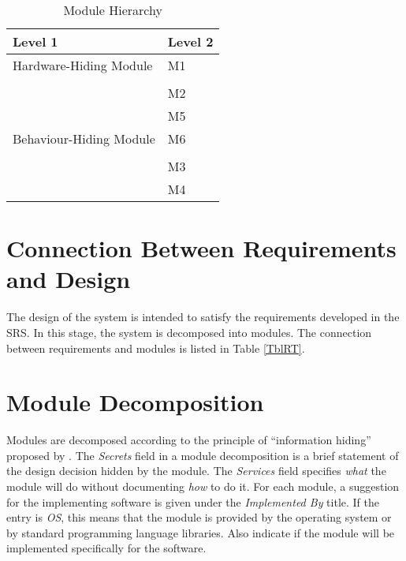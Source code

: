 \documentclass[12pt, titlepage]{article}
\begin{document}
\begin{table}[h!]
\centering
\begin{tabular}{p{} p{}}
\toprule
\textbf{Level 1} & \textbf{Level 2}\\
\midrule

{Hardware-Hiding Module} & M1 \\
\midrule

\multirow{7}{0.3\textwidth}{Behaviour-Hiding Module} & \\
& M2 \\
& M5 \\
& M6 \\
\midrule

\multirow{3}{0.3\textwidth}{Software Decision Module} & \\
& M3\\
& M4\\
\bottomrule

\end{tabular}
\caption{Module Hierarchy}
\label{TblMH}
\end{table}

\section{Connection Between Requirements and Design} \label{SecConnection}

The design of the system is intended to satisfy the requirements developed in
the SRS. In this stage, the system is decomposed into modules. The connection
between requirements and modules is listed in Table \ref{TblRT}.

\section{Module Decomposition} \label{SecMD}

Modules are decomposed according to the principle of ``information hiding''
proposed by \citet{ParnasEtAl1984}. The \emph{Secrets} field in a module
decomposition is a brief statement of the design decision hidden by the
module. The \emph{Services} field specifies \emph{what} the module will do
without documenting \emph{how} to do it. For each module, a suggestion for the
implementing software is given under the \emph{Implemented By} title. If the
entry is \emph{OS}, this means that the module is provided by the operating
system or by standard programming language libraries.  Also indicate if the
module will be implemented specifically for the software.
\end{document}
